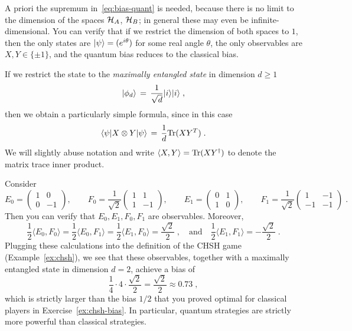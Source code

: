 A priori the supremum in~\eqref{eq:bias-quant} is needed, because there is no limit to the dimension of the spaces $\mathcal{H}_A$, $\mathcal{H}_B$; in general these may even be infinite-dimensional. 
You can verify that if we restrict the dimension of both spaces to $1$, then the only states are $|\psi\rangle = (e^{i\theta})$ for some real angle $\theta$, the only observables are $X,Y\in\{\pm 1\}$, and the quantum bias reduces to the classical bias.


If we restrict the state to the \emph{maximally entangled state} in dimension $d\geq 1$
\[|\phi_{d}\rangle \,=\, \frac{1}{\sqrt{d}} |i\rangle|i\rangle\;,\]
then we obtain a particularly simple formula, since in this case
 $$\langle\psi| X\otimes Y |\psi\rangle \,=\, \frac{1}{d} \mbox{\rm Tr}(XY^T)\;.$$
We will slightly abuse notation and write  $\langle X, Y\rangle = \mbox{\rm Tr}(XY^\dagger)$ to denote the matrix trace inner product. 

\begin{example}\label{ex:chsh-qbias}
Consider 
\begin{equation*}
E_0=\left(\begin{array}{cc}1&0\\0&-1\end{array}\right),\qquad
F_0=\frac{1}{\sqrt{2}}\left(\begin{array}{cc}1&1\\1&-1\end{array}\right),\qquad
E_1=\left(\begin{array}{cc}0&1\\1&0\end{array}\right),\qquad
F_1=\frac{1}{\sqrt{2}}\left(\begin{array}{cc}1&-1\\-1&-1\end{array}\right)\;.
\end{equation*}
Then you can verify that $E_0,E_1,F_0,F_1$ are observables. Moreover, 
$$\frac{1}{2} \langle E_0, F_0\rangle = \frac{1}{2}\langle E_0, F_1\rangle = \frac{1}{2} \langle E_1, F_0\rangle =\frac{\sqrt{2}}{2}\;,\quad\text{and}\quad \frac{1}{2}\langle  E_1,F_1\rangle = -\frac{\sqrt{2}}{2}\;.$$
 Plugging these calculations into the definition of the CHSH game (Example~\ref{ex:chsh}), we see that these observables, together with a maximally entangled state in dimension $d=2$, achieve a bias of
$$
\frac{1}{4}\cdot 4\cdot \frac{\sqrt{2}}{2} =\frac{\sqrt{2}}{2} \approx 0.73\;,
$$
which is strictly larger than the bias $1/2$ that you proved optimal for classical players in Exercise~\ref{ex:chsh-bias}. In particular, quantum strategies are strictly more powerful than classical strategies.
\end{example}

